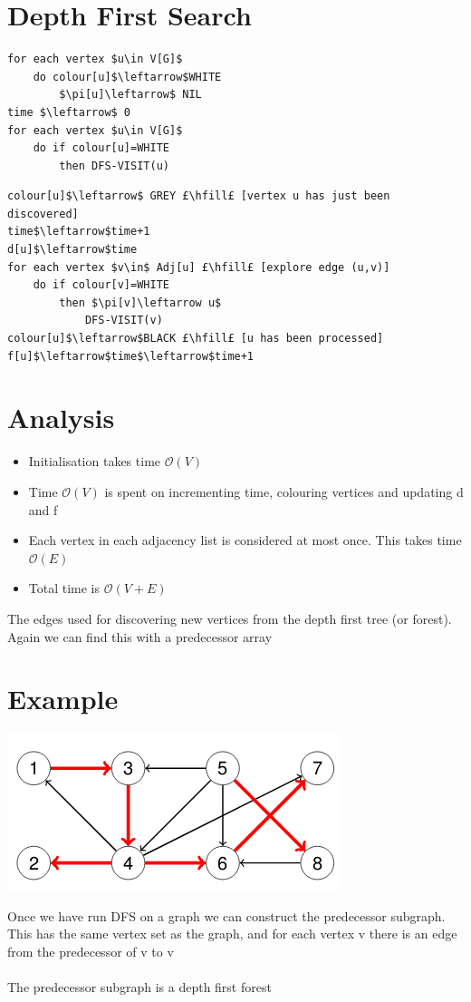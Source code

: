\documentclass{article}[18pt]
\begin{document}
\section{Depth First Search}
\begin{lstlisting}[caption=DFS(G)]
for each vertex $u\in V[G]$
	do colour[u]$\leftarrow$WHITE
		$\pi[u]\leftarrow$ NIL
time $\leftarrow$ 0
for each vertex $u\in V[G]$
	do if colour[u]=WHITE
		then DFS-VISIT(u)
\end{lstlisting}
\begin{lstlisting}[caption=DFS-VISIT(u)]
colour[u]$\leftarrow$ GREY £\hfill£ [vertex u has just been discovered]
time$\leftarrow$time+1
d[u]$\leftarrow$time
for each vertex $v\in$ Adj[u] £\hfill£ [explore edge (u,v)]
	do if colour[v]=WHITE
		then $\pi[v]\leftarrow u$
			DFS-VISIT(v)
colour[u]$\leftarrow$BLACK £\hfill£ [u has been processed]
f[u]$\leftarrow$time$\leftarrow$time+1
\end{lstlisting}
\section{Analysis}
\begin{itemize}
	\item Initialisation takes time $\mathcal{O}(V)$
	\item Time $\mathcal{O}(V)$ is spent on incrementing time, colouring vertices and updating d and f
	\item Each vertex in each adjacency list is considered at most once. This takes time $\mathcal{O}(E)$
	\item Total time is $\mathcal{O}(V+E)$
\end{itemize}
The edges used for discovering new vertices from the depth first tree (or forest). Again we can find this with a predecessor array
\section{Example}
\begin{center}
	\includegraphics[scale=0.7]{Example1}
\end{center}
Once we have run DFS on a graph we can construct the predecessor subgraph. This has the same vertex set as the graph, and for each vertex v there is an edge from the predecessor of v to v\\
\\
The predecessor subgraph is a depth first forest
\end{document}
